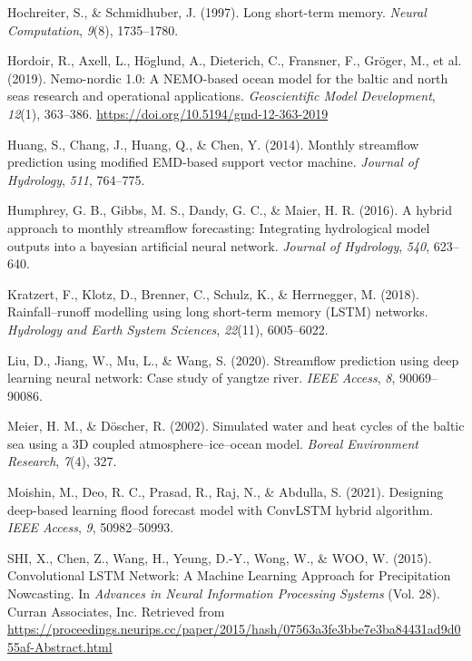 \documentclass[
]{agujournal2019}
\newlength{\cslhangindent}
\newenvironment{CSLReferences}[2] %
 {\begin{list}{}{%
  \setlength{\itemindent}{0pt}
  \setlength{\leftmargin}{0pt}
  \setlength{\parsep}{0pt}
  \ifodd #1
   \setlength{\leftmargin}{\cslhangindent}
   \setlength{\itemindent}{-1\cslhangindent}
  \fi
  \setlength{\itemsep}{#2\baselineskip}}}
 {\end{list}}
\begin{document}
\begin{CSLReferences}{1}{0}
Hochreiter, S., \& Schmidhuber, J. (1997). Long short-term memory.
\emph{Neural Computation}, \emph{9}(8), 1735--1780.

Hordoir, R., Axell, L., Höglund, A., Dieterich, C., Fransner, F.,
Gröger, M., et al. (2019). Nemo-nordic 1.0: A NEMO-based ocean model for
the baltic and north seas {\textendash} research and operational
applications. \emph{Geoscientific Model Development}, \emph{12}(1),
363--386. \url{https://doi.org/10.5194/gmd-12-363-2019}

Huang, S., Chang, J., Huang, Q., \& Chen, Y. (2014). Monthly streamflow
prediction using modified EMD-based support vector machine.
\emph{Journal of Hydrology}, \emph{511}, 764--775.

Humphrey, G. B., Gibbs, M. S., Dandy, G. C., \& Maier, H. R. (2016). A
hybrid approach to monthly streamflow forecasting: Integrating
hydrological model outputs into a bayesian artificial neural network.
\emph{Journal of Hydrology}, \emph{540}, 623--640.

Kratzert, F., Klotz, D., Brenner, C., Schulz, K., \& Herrnegger, M.
(2018). Rainfall--runoff modelling using long short-term memory (LSTM)
networks. \emph{Hydrology and Earth System Sciences}, \emph{22}(11),
6005--6022.

Liu, D., Jiang, W., Mu, L., \& Wang, S. (2020). Streamflow prediction
using deep learning neural network: Case study of yangtze river.
\emph{IEEE Access}, \emph{8}, 90069--90086.

Meier, H. M., \& Döscher, R. (2002). Simulated water and heat cycles of
the baltic sea using a 3D coupled atmosphere--ice--ocean model.
\emph{Boreal Environment Research}, \emph{7}(4), 327.

Moishin, M., Deo, R. C., Prasad, R., Raj, N., \& Abdulla, S. (2021).
Designing deep-based learning flood forecast model with ConvLSTM hybrid
algorithm. \emph{IEEE Access}, \emph{9}, 50982--50993.

SHI, X., Chen, Z., Wang, H., Yeung, D.-Y., Wong, W., \& WOO, W. (2015).
Convolutional {LSTM Network}: {A Machine Learning Approach} for
{Precipitation Nowcasting}. In \emph{Advances in {Neural Information
Processing Systems}} (Vol. 28). Curran Associates, Inc. Retrieved from
\url{https://proceedings.neurips.cc/paper/2015/hash/07563a3fe3bbe7e3ba84431ad9d055af-Abstract.html}


\end{CSLReferences}
\end{document}
